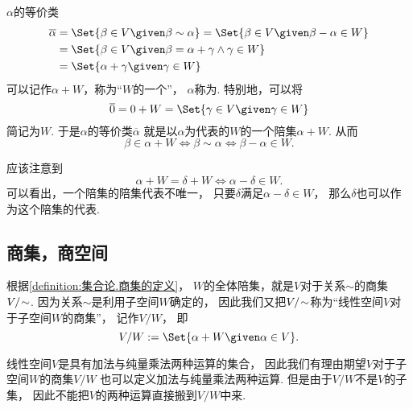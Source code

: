 \(\alpha\)的等价类\begin{align*}
	\overline{\alpha}
	&=\Set{ \beta \in V \given \beta \sim \alpha }
	=\Set{ \beta \in V \given \beta-\alpha \in W } \\
	&=\Set{ \beta \in V \given \beta=\alpha+\gamma \land \gamma \in W } \\
	&=\Set{ \alpha+\gamma \given \gamma \in W }
\end{align*}
可以记作\(\alpha+W\)，称为“\(W\)的一个”，
\(\alpha\)称为.
特别地，可以将\[
	\overline{0}
	= 0+W
	= \Set{
		\gamma \in V
		\given
		\gamma \in W
	}
\]简记为\(W\).
于是\(\alpha\)的等价类\(\overline{\alpha}\)
就是以\(\alpha\)为代表的\(W\)的一个陪集\(\alpha+W\).
从而\[
	\beta \in \alpha + W
	\iff
	\beta \sim \alpha
	\iff
	\beta - \alpha \in W.
\]

应该注意到\[
	\alpha + W = \delta + W
	\iff
	\alpha - \delta \in W.
\]
可以看出，一个陪集的陪集代表不唯一，
只要\(\delta\)满足\(\alpha-\delta \in W\)，
那么\(\delta\)也可以作为这个陪集的代表.

\subsection{商集，商空间}
根据\cref{definition:集合论.商集的定义}，
\(W\)的全体陪集，就是\(V\)对于关系\(\sim\)的商集\(V/\kern-2pt\sim\).
因为关系\(\sim\)是利用子空间\(W\)确定的，
因此我们又把\(V/\kern-2pt\sim\)称为“线性空间\(V\)对于子空间\(W\)的商集”，
记作\(V/W\)，
即\[
	V/W
	\defeq
	\Set{ \alpha+W \given \alpha \in V }.
\]

线性空间\(V\)是具有加法与纯量乘法两种运算的集合，
因此我们有理由期望\(V\)对于子空间\(W\)的商集\(V/W\)
也可以定义加法与纯量乘法两种运算.
但是由于\(V/W\)不是\(V\)的子集，
因此不能把\(V\)的两种运算直接搬到\(V/W\)中来.

